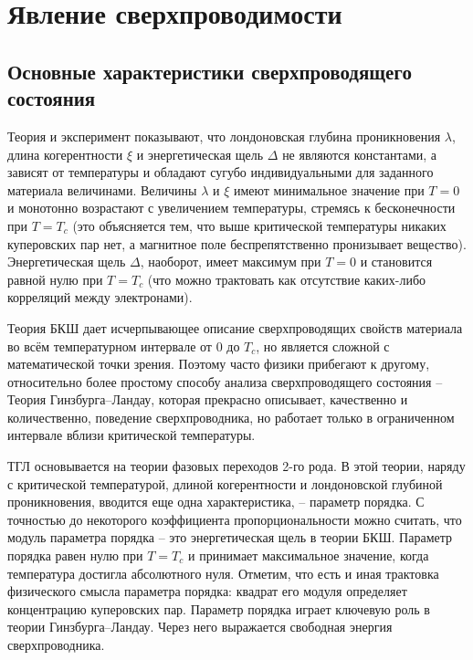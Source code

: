 \chapter{Явление сверхпроводимости}

\section{Основные характеристики сверхпроводящего состояния}

Теория и эксперимент показывают, что лондоновская глубина проникновения 
\( \lambda \), длина когерентности \( \xi \) и энергетическая щель 
\( \Delta \) не являются константами, а зависят от температуры и обладают 
сугубо индивидуальными для заданного материала величинами. Величины 
\( \lambda \) и \( \xi \) имеют минимальное значение при \( T = 0 \) и 
монотонно возрастают с увеличением температуры, стремясь к бесконечности при 
\( T = T_c \) (это объясняется тем, что выше критической температуры никаких 
куперовских пар нет, а магнитное поле беспрепятственно пронизывает вещество). 
Энергетическая щель \( \Delta \), наоборот, имеет максимум при \( T = 0 \) и 
становится равной нулю при \( T = T_c \) (что можно трактовать как отсутствие 
каких-либо корреляций между электронами).

Теория БКШ дает исчерпывающее описание сверхпроводящих свойств материала во 
всём температурном интервале от \( 0 \) до \( T_c \), но является сложной с 
математической точки зрения. Поэтому часто физики прибегают к другому, 
относительно более простому способу анализа сверхпроводящего состояния -- 
Теория Гинзбурга–Ландау, которая прекрасно описывает, качественно и 
количественно, поведение сверхпроводника, но работает только в ограниченном 
интервале вблизи критической температуры.

ТГЛ основывается на теории фазовых переходов 2-го рода. В этой теории, наряду 
с критической температурой, длиной когерентности и лондоновской глубиной 
проникновения, вводится еще одна характеристика, -- параметр порядка. С 
точностью до некоторого коэффициента пропорциональности можно считать, что 
модуль параметра порядка -- это энергетическая щель в теории БКШ. Параметр 
порядка равен нулю при \( T = T_c \) и принимает максимальное значение, когда 
температура достигла абсолютного нуля. Отметим, что есть и иная трактовка 
физического смысла параметра порядка: квадрат его модуля определяет 
концентрацию куперовских пар. Параметр порядка играет ключевую роль в теории 
Гинзбурга–Ландау. Через него выражается свободная энергия сверхпроводника. 
\cite{bib:net}

